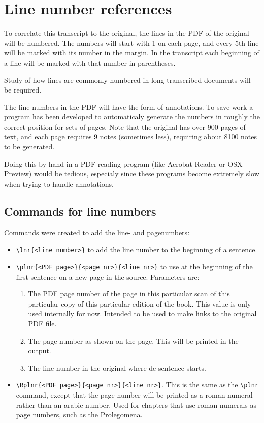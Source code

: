 \documentclass{report}
\begin{document}
\section{Line number references}
To correlate this transcript to the original,  the lines
in the PDF of the original will be numbered.
The numbers will start with 1 on each page, and every 5th line will be marked
with its number in the margin.
In the transcript each beginning of a line will be marked with that number
in parentheses.

Study of how lines are commonly numbered in long transcribed documents
will be required.

The line numbers in the PDF will have the form of annotations. To save work
a program has been developed to automaticaly generate the numbers in roughly
the correct position for sets of pages. Note that the original has over 900
pages of text, and each page requires 9 notes (sometimes less), requiring
about 8100 notes to be generated.

Doing this by hand in a PDF reading program (like Acrobat Reader or OSX Preview)
would be tedious, especialy since these programs become extremely slow when
trying to handle annotations.

\subsection{Commands for line numbers}
Commands were created to add the line- and pagenumbers:
\begin{itemize}
\item \verb+\lnr{<line number>}+ to add the line number to the beginning of
a sentence.
\item \verb+\plnr{<PDF page>}{<page nr>}{<line nr>}+ to use at the beginning of the first sentence on a new page in the source. Parameters are:
\begin{enumerate}
\item The PDF page number of the page in this particular scan of this particular
copy of this particular edition of the book.
This value is only used internally for now. Intended to be used to
make links to the original PDF file.
\item The page number as shown on the page. This will be printed in the output.
\item The line number in the original where de sentence starts.
\end{enumerate}
\item \verb+\Rplnr{<PDF page>}{<page nr>}{<line nr>}+. This is the same as the
 \verb+\plnr+ command, except that the page number will be printed as a roman
 numeral rather than an arabic number. Used for chapters that use roman numerals
 as page numbers, such as the Prolegomena.
\end{itemize}
\end{document}
